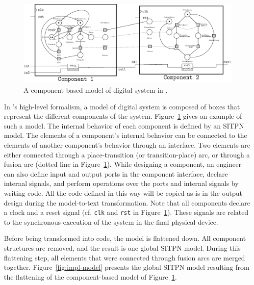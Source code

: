 \documentclass[pdflatex,sn-mathphys]{sn-jnl}%
\theoremstyle{thmstyleone}%
\theoremstyle{thmstyletwo}%
\theoremstyle{thmstylethree}%
\begin{document}
\begin{figure}[H]
\centering
\includegraphics[keepaspectratio=true,width=\textwidth]{abs-model.eps}
\caption[An example of model of digital system in \hilecop{}.]{A
  component-based model of digital system in \hilecop{}.}
\label{fig:abs-model}
\end{figure}

In \hilecop{}'s high-level formalism, a model of digital system is
composed of boxes that represent the different components of the
system. Figure~\ref{fig:abs-model} gives an example of such a model.
The internal behavior of each component is defined by an SITPN model.
The elements of a component's internal behavior can be connected to
the elements of another component's behavior through an interface. Two
elements are either connected through a place-transition (or
transition-place) arc, or through a fusion arc (dotted line in
Figure~\ref{fig:abs-model}). While designing a component, an engineer
can also define input and output ports in the component interface,
declare internal signals, and perform operations over the ports and
internal signals by writing \vhdl{} code. All the \vhdl{} code defined
in this way will be copied as is in the output \vhdl{} design during
the model-to-text transformation. Note that all components declare a
clock and a reset signal (cf. \texttt{clk} and \texttt{rst} in
Figure~\ref{fig:abs-model}). These signals are related to the
synchronous execution of the system in the final physical device.

Before being transformed into \vhdl{} code, the model is flattened
down. All component structures are removed, and the result is one
global SITPN model. During this flattening step, all elements that
were connected through fusion arcs are merged
together. Figure~\ref{fig:impl-model} presents the global SITPN model
resulting from the flattening of the component-based model of
Figure~\ref{fig:abs-model}.
\end{document}
